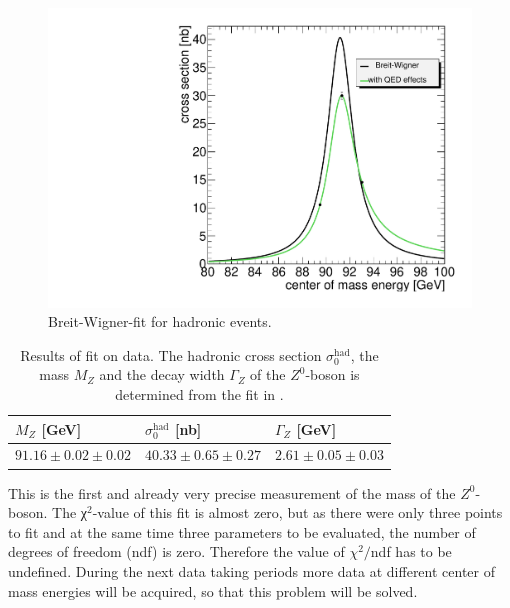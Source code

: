 \documentclass[epj,nopacs]{svjour}
\begin{document}
\begin{figure}[htb]
 \centering
 \includegraphics[width=1\columnwidth,keepaspectratio]{finalhad_fit}
 \caption{Breit-Wigner-fit for hadronic events.}
 \label{fig:fit_hadrons}
\end{figure}

\begin{table}[h]
\begin{center}
\begin{tabular}{|l|l|l|}
\hline
$M_Z$ [\si{\GeV}] & $σ_0^{\mathrm{had}}$  [\si{\nano\barn}] & $Γ_Z$
[\si{\GeV}]\\
\hline
$91.16 \pm 0.02 \pm 0.02$ & $40.33 \pm 0.65 \pm 0.27$ & $2.61 \pm 0.05 \pm 0.03$\\
\hline
\end{tabular}
\vspace*{0.3cm}
\caption{\baselineskip=0.38cm Results of fit on data. The hadronic cross section
$σ_0^{\mathrm{had}}$, the mass $M_Z$ and the decay width $Γ_Z$ of the
$Z^0$-boson is determined from the fit in .}
\label{tab:results}
\end{center}
\vspace*{-0.5cm}
\end{table}
This is the first and already very precise measurement of the mass of the $Z^0$-boson. 
The χ$^2$-value of this fit is almost zero, but as there were only three points
to fit and at the same time three parameters to be evaluated, the
number of degrees of freedom (ndf) is zero. Therefore the value of $χ^2/$ndf has to be
undefined. During the next data taking periods more data at different center of
mass energies will be acquired, so that this problem will be solved.
\end{document}
